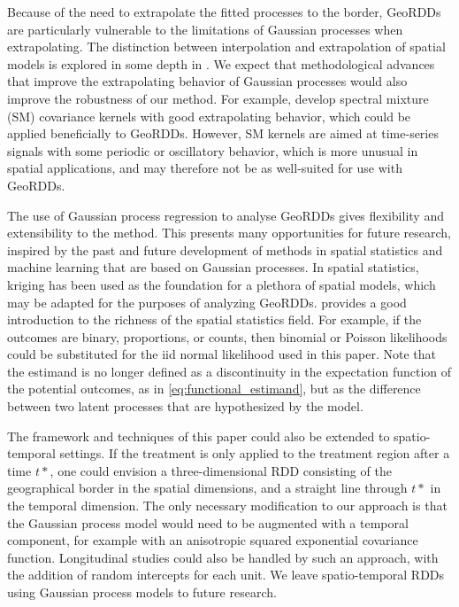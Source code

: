 \documentclass[letter]{article}
\renewcommand{\cite}[1]{\citep{#1}}
\begin{document}
Because of the need to extrapolate the fitted processes to the border, GeoRDDs are particularly vulnerable to the limitations of Gaussian processes when extrapolating.
The distinction between interpolation and extrapolation of spatial models is explored in some depth in \cite{stein2012interpolation}.
We expect that methodological advances that improve the extrapolating behavior of Gaussian processes would also improve the robustness of our method.
For example, \cite{wilson2013gaussian} develop spectral mixture (SM) covariance kernels with good extrapolating behavior, which could be applied beneficially to GeoRDDs.
However, SM kernels are aimed at time-series signals with some periodic or oscillatory behavior, which is more unusual in spatial applications, and may therefore not be as well-suited for use with GeoRDDs.
    


    	The use of Gaussian process regression to analyse GeoRDDs gives flexibility and extensibility to the method.
This presents many opportunities for future research, inspired by the past and future development of methods in spatial statistics and machine learning that are based on Gaussian processes.
In spatial statistics, kriging has been used as the foundation for a plethora of spatial models, which may be adapted for the purposes of analyzing GeoRDDs.
\cite{banerjee2014hierarchical} provides a good introduction to the richness of the spatial statistics field.
For example, if the outcomes are binary, proportions, or counts, then binomial or Poisson likelihoods could be substituted for the iid normal likelihood used in this paper.
Note that the estimand is no longer defined as a discontinuity in the expectation function of the potential outcomes, as in \eqref{eq:functional_estimand}, but as the difference between two latent processes that are hypothesized by the model.

The framework and techniques of this paper could also be extended to spatio-temporal settings.
If the treatment is only applied to the treatment region after a time \(t*\), one could envision a three-dimensional RDD consisting of the geographical border in the spatial dimensions, and a straight line through \(t*\) in the temporal dimension.
The only necessary modification to our approach is that the Gaussian process model would need to be augmented with a temporal component, for example with an anisotropic squared exponential covariance function.
Longitudinal studies could also be handled by such an approach, with the addition of random intercepts for each unit.
We leave spatio-temporal RDDs using Gaussian process models to future research.
    
\end{document}
